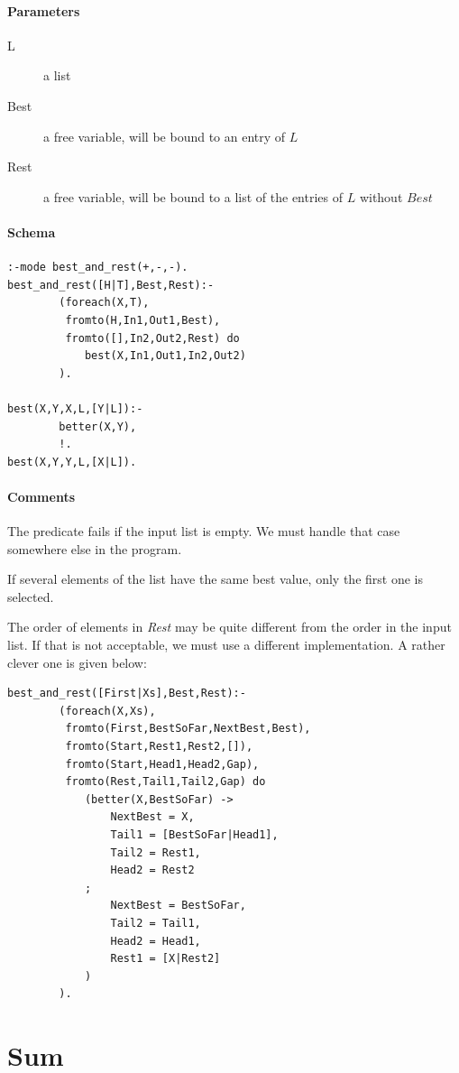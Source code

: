 \documentclass[a4paper,12pt]{report}
\begin{document}
\paragraph{Parameters}
\begin{description}
\item[L] a list
\item[Best] a free variable, will be bound to an entry of $L$
\item[Rest] a free variable, will be bound to a list of the entries of $L$ without $Best$
\end{description}
\paragraph{Schema}
\begin{verbatim}
:-mode best_and_rest(+,-,-).
best_and_rest([H|T],Best,Rest):-
        (foreach(X,T),
         fromto(H,In1,Out1,Best),
         fromto([],In2,Out2,Rest) do
            best(X,In1,Out1,In2,Out2)
        ).

best(X,Y,X,L,[Y|L]):-
        better(X,Y),
        !.
best(X,Y,Y,L,[X|L]).
\end{verbatim}
\paragraph{Comments}
The predicate fails if the input list is empty. We must handle that case somewhere else in the program.

If several elements of the list have the same best value, only the first one is selected. 

The order of elements in {\it Rest} may be quite different from the order in the input list. If that is not acceptable, we must use a different implementation. A rather clever one is given below:
\pagebreak
\begin{verbatim}
best_and_rest([First|Xs],Best,Rest):-
        (foreach(X,Xs),
         fromto(First,BestSoFar,NextBest,Best),
         fromto(Start,Rest1,Rest2,[]),
         fromto(Start,Head1,Head2,Gap),
         fromto(Rest,Tail1,Tail2,Gap) do
            (better(X,BestSoFar) ->
                NextBest = X,
                Tail1 = [BestSoFar|Head1],
                Tail2 = Rest1,
                Head2 = Rest2
            ;
                NextBest = BestSoFar,
                Tail2 = Tail1,
                Head2 = Head1,
                Rest1 = [X|Rest2]
            )
        ).
\end{verbatim}
\pagebreak
\section{Sum}
\end{document}
